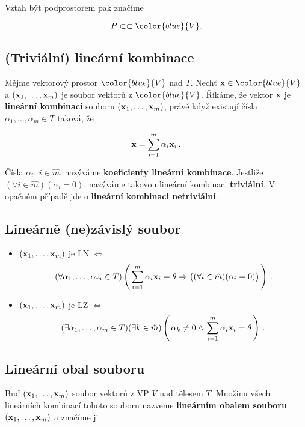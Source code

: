 Vztah být podprostorem pak značíme

\[ P\subset \subset \color{blue}{V}. \]

\subsection*{(Triviální) lineární kombinace}

Mějme vektorový prostor $\color{blue}{V}$ nad $T$. Nechť $\vx\in
      \color{blue}{V}$ a $(\mathbf{x}_{1},\dots,\mathbf{x}_{m})$ je soubor vektorů z
$\color{blue}{V}$. Říkáme, že vektor $\mathbf{x}$ je \textbf{lineární kombinací}
souboru $(\mathbf{x}_{1},\dots,\mathbf{x}_{m})$, právě když existují čísla
$\alpha_{1},\dots,\alpha_{m}\in T$ taková, že

\[ \mathbf{x}=\sum_{i=1}^{m}\alpha_{i}\mathbf{x}_{i}\,. \]

Čísla $\alpha_{i}$, $i\in\hat{m}$, nazýváme \textbf{koeficienty lineární kombinace}.
Jestliže $(\forall i\in\hat{m})(\alpha_{i}=0)$, nazýváme takovou lineární kombinaci \textbf{triviální}.
V opačném případě jde o \textbf{lineární kombinaci netriviální}.

\subsection*{Lineárně (ne)závislý soubor}

\begin{itemize}
      \item $(\mathbf{x}_{1},\dots,\mathbf{x}_{m})$ je LN $\Leftrightarrow$
            \[ (\forall \alpha_{1},\dots,\alpha_{m}\in T)\left(\,\sum_{i=1}^{m}\alpha_{i}\mathbf{x}_{i}=\theta \Rightarrow \big((\forall i\in\hat{m})(\alpha_{i}=0)\big)\,\right)\,. \]
      \item $(\mathbf{x}_{1},\dots,\mathbf{x}_{m})$ je LZ $\Leftrightarrow$
            \[ (\exists \alpha_{1},\dots,\alpha_{m}\in T) (\exists k\in\hat{m})
                  \left(\,\alpha_{k}\neq0 \wedge \,\sum_{i=1}^{m}\alpha_{i}\mathbf{x}_{i}=\theta\,\right)\,.
            \]
\end{itemize}

\subsection*{Lineární obal souboru}

Buď $(\mathbf{x}_{1},\dots,\mathbf{x}_{m})$ soubor vektorů z VP $V$ nad tělesem $T$. Množinu
všech lineárních kombinací tohoto souboru nazveme \textbf{lineárním obalem
      souboru} $(\mathbf{x}_{1},\dots,\mathbf{x}_{m})$ a značíme ji

